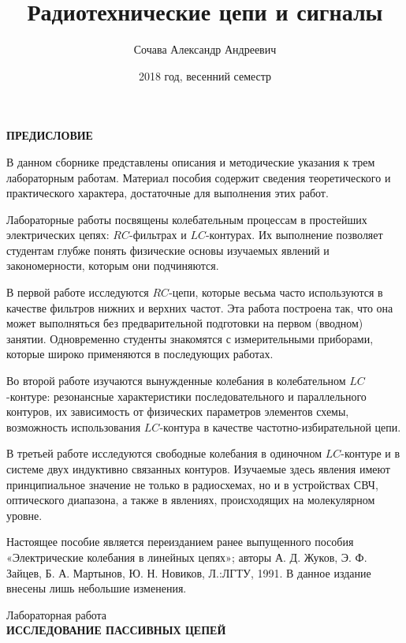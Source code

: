 \documentclass[a4paper,12pt]{report}
\author{Сочава Александр Андреевич}
\title{Радиотехнические цепи и сигналы}
\date{2018 год, весенний семестр}
\begin{document}
\makeatletter
{}
\makeatother  

\maketitle
\newpage

\begin{center}
\textbf{ПРЕДИСЛОВИЕ}
\end{center}

	В данном сборнике представлены описания и методические указания к трем лабораторным работам. Материал пособия содержит сведения теоретического и практического характера, достаточные для выполнения этих работ.
	
Лабораторные работы посвящены колебательным процессам в простейших электрических цепях: $RC$-фильтрах и $LC$-контурах. Их выполнение позволяет студентам глубже понять физические основы изучаемых явлений и закономерности, которым они подчиняются.

	В первой работе исследуются $RC$-цепи, которые весьма часто используются в качестве фильтров нижних и верхних частот. Эта работа построена так, что она может выполняться без предварительной подготовки на первом (вводном) занятии. Одновременно студенты знакомятся с измерительными приборами, которые широко применяются в последующих работах.
	
	Во второй работе изучаются вынужденные колебания в колебательном $LC$-контуре: резонансные характеристики последовательного и параллельного контуров, их зависимость от физических параметров элементов схемы, возможность использования $LC$-контура в качестве частотно-избирательной цепи.
	
	В третьей работе исследуются свободные колебания в одиночном $LC$-контуре и в системе двух индуктивно связанных контуров. Изучаемые здесь явления имеют принципиальное значение не только в радиосхемах, но и в устройствах СВЧ, оптического диапазона, а также в явлениях, происходящих на молекулярном уровне.
	
	Настоящее пособие является переизданием ранее выпущенного пособия «Электрические колебания в линейных цепях»; авторы А. Д. Жуков, Э. Ф. Зайцев, Б. А. Мартынов, Ю. Н. Новиков, Л.:ЛГТУ, 1991. В данное издание внесены лишь небольшие изменения.
\newpage
\begin{center}
Лабораторная работа\\
\textbf{ИССЛЕДОВАНИЕ ПАССИВНЫХ ЦЕПЕЙ}
\end{center}
\end{document}
